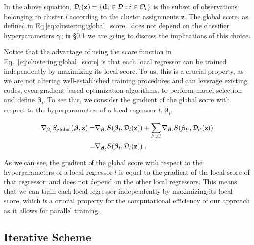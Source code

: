In the above equation, $\mathcal{D}_l(\mathbf{z}) = \{\mathbf{d}_i \in \mathcal{D} : i \in \mathcal{O}_l\}$ is the subset of observations belonging to cluster $l$ according to the cluster assignments $\mathbf{z}$. The global score, as defined in Eq.\eqref{eq:clustering:global_score}, does not depend on the classifier hyperparameters $\boldsymbol{\gamma}$; in \S\ref{sec:clustering:mb:it} we are going to discuss the implications of this choice. 

\smallskip
Notice that the advantage of using the score function in Eq.~\eqref{eq:clustering:global_score} is that each local regressor can be trained independently by maximizing its local score. To us, this is a crucial property, as we are not altering well-established training procedures and can leverage existing codes, even gradient-based optimization algorithms, to perform model selection and define $\boldsymbol{\beta}_l$. To see this, we consider the gradient of the global score with respect to the hyperparameters of a local regressor $l$, $\boldsymbol{\beta}_l$,

\begin{equation}
  \left.
  \begin{aligned}
    \nabla_{\boldsymbol{\beta}_l} S_{\mathrm{global}}(\boldsymbol{\beta}, \mathbf{z}) =& \nabla_{\boldsymbol{\beta}_l} S(\boldsymbol{\beta}_l, \mathcal{D}_l(\mathbf{z})) + \sum_{l^\prime \neq l} \nabla_{\boldsymbol{\beta}_l} S(\boldsymbol{\beta}_{l^\prime}, \mathcal{D}_{l^\prime}(\mathbf{z}))\\
    =& \nabla_{\boldsymbol{\beta}_l} S(\boldsymbol{\beta}_l, \mathcal{D}_l(\mathbf{z}))\;.
  \end{aligned}
  \right.
\end{equation}

As we can see, the gradient of the global score with respect to the hyperparameters of a local regressor $l$ is equal to the gradient of the local score of that regressor, and does not depend on the other local regressors. This means that we can train each local regressor independently by maximizing its local score, which is a crucial property for the computational efficiency of our approach as it allows for parallel training. 

\subsection{Iterative Scheme}
\label{sec:clustering:mb:it}


